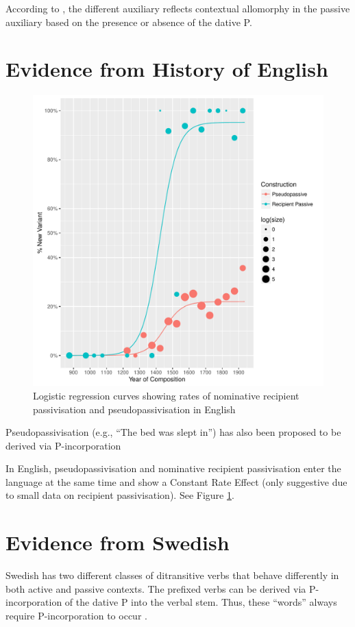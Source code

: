\documentclass[11pt]{article}
\begin{document}
According to \cite{Alexiadou.2014}, the different auxiliary reflects contextual allomorphy in the passive auxiliary based on the presence or absence of the dative P.

\newpage
\section{Evidence from History of English}

	\begin{figure}[t!]
		\includegraphics[width=\linewidth]{../images/recpas-pseudo}
		\caption{Logistic regression curves showing rates of nominative recipient passivisation and pseudopassivisation in English}
		\label{fig:recpas-pseudo}
	\end{figure}


Pseudopassivisation (e.g., ``The bed was slept in'') has also been proposed to be derived via P-incorporation \citep{Herslund.1984}

In English, pseudopassivisation and nominative recipient passivisation enter the language at the same time and show a Constant Rate Effect (only suggestive due to small data on recipient passivisation). See Figure \ref{fig:recpas-pseudo}.


\section{Evidence from Swedish}
Swedish has two different classes of ditransitive verbs that behave differently in both active and passive contexts. The prefixed verbs can be derived via P-incorporation of the dative P into the verbal stem. Thus, these ``words'' always require P-incorporation to occur \citep{Holmberg.1995}.
\end{document}
